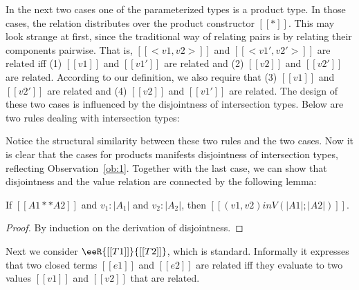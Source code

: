 In the next two cases one of the parameterized types is a product type. In those
cases, the relation distributes over the product constructor $[[*]]$. This may
look strange at first, since the traditional way of relating pairs is by
relating their components pairwise. That is, $[[<v1,v2>]]$ and $[[<v1', v2'>]]$
are related iff (1) $[[v1]]$ and $[[v1']]$ are related and (2) $[[v2]]$ and
$[[v2']]$ are related. According to our definition, we also require that (3)
$[[v1]]$ and $[[v2']]$ are related and (4) $[[v2]]$ and $[[v1']]$ are related.
The design of these two cases is influenced by the disjointness of intersection
types. Below are two rules dealing with intersection types:
\renewcommand\ottaltinferrule[4]{
  \inferrule*[narrower=0.5,right=#1,#2]
    {#3}
    {#4}
}
Notice the structural similarity between these two rules and the two cases. Now
it is clear that the cases for products manifests disjointness of intersection
types, reflecting Observation~\ref{ob:1}. Together with the last case, we can
show that disjointness and the value relation are connected by the following
lemma:
\renewcommand\ottaltinferrule[4]{
  \inferrule*[narrower=0.5,lab=#1,#2]
    {#3}
    {#4}
}

\begin{lemma}\label{lemma:disjoint}
  If $[[A1 ** A2]]$ and $v_1 : |A_1|$ and $v_2 : |A_2|$, then $[[(v1, v2) in V (|A1| ; |A2|)]]$.
\end{lemma}
\begin{proof}
  By induction on the derivation of disjointness.
\end{proof}

Next we consider $\eeR{[[T1]]}{[[T2]]}$, which is standard. Informally it expresses
that two closed terms $[[e1]]$ and $[[e2]]$ are related iff
they evaluate to two values $[[v1]]$ and $[[v2]]$ that are related.



